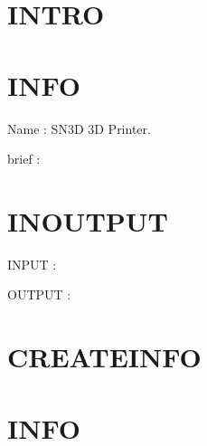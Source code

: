 \hypertarget{index_INTRO}{}\section{I\+N\+T\+RO}\label{index_INTRO}

\begin{DoxyItemize}
\item 
\end{DoxyItemize}\hypertarget{index_PROJECT}{}\section{I\+N\+FO}\label{index_PROJECT}

\begin{DoxyItemize}
\item Name \+: S\+N3D 3D Printer.
\item brief \+: 
\end{DoxyItemize}\hypertarget{index_INOUTPUT}{}\section{I\+N\+O\+U\+T\+P\+UT}\label{index_INOUTPUT}

\begin{DoxyItemize}
\item I\+N\+P\+UT \+:
\item O\+U\+T\+P\+UT \+: 
\end{DoxyItemize}\hypertarget{index_CREATEINFO}{}\section{C\+R\+E\+A\+T\+E\+I\+N\+FO}\label{index_CREATEINFO}

\begin{DoxyItemize}
\item 
\end{DoxyItemize}\hypertarget{index_MODIFY}{}\section{I\+N\+FO}\label{index_MODIFY}

\begin{DoxyItemize}
\item 
\item 
\end{DoxyItemize}